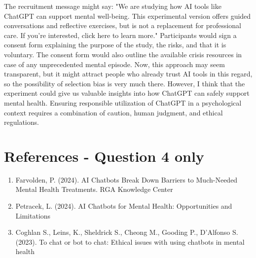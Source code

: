 \documentclass[
	letterpaper, %
]{jdf}
\begin{document}
The recruitment message might say: "We are studying how AI tools like ChatGPT can support mental well-being. This experimental version offers guided conversations and reflective exercises, but is not a replacement for professional care. If you’re interested, click here to learn more." Participants would sign a consent form explaining the purpose of the study, the risks, and that it is voluntary. The consent form would also outline the available crisis resources in case of any unprecedented mental episode. Now, this approach may seem transparent, but it might attract people who already trust AI tools in this regard, so the possibility of selection bias is very much there. However, I think that the experiment could give us valuable insights into how ChatGPT can safely support mental health. Ensuring responsible utilization of ChatGPT in a psychological context requires a combination of caution, human judgment, and ethical regulations.



\newpage

\section{References - Question 4 only}

\printbibliography[heading=none]
\begin{enumerate}
    \item Farvolden, P. (2024). AI Chatbots Break Down Barriers to Much-Needed Mental Health Treatments. RGA Knowledge Center
    \item Petracek, L. (2024). AI Chatbots for Mental Health: Opportunities and Limitations
    \item Coghlan S., Leins, K., Sheldrick S., Cheong M., Gooding P., D'Alfonso S. (2023). To chat or bot to chat: Ethical issues with using chatbots in mental health

\end{enumerate}
\end{document}
